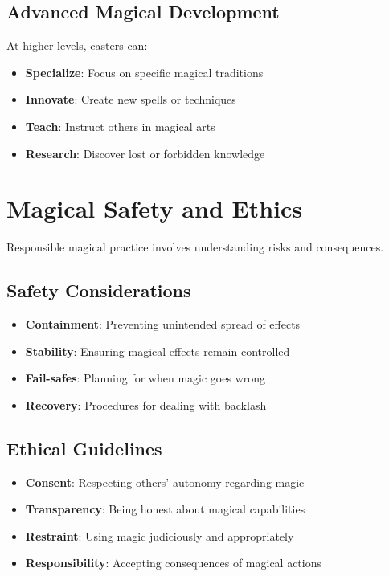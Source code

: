\subsection*{Advanced Magical Development}
At higher levels, casters can:
\begin{itemize}
\item \textbf{Specialize}: Focus on specific magical traditions
\item \textbf{Innovate}: Create new spells or techniques
\item \textbf{Teach}: Instruct others in magical arts
\item \textbf{Research}: Discover lost or forbidden knowledge
\end{itemize}

\section{Magical Safety and Ethics}  

Responsible magical practice involves understanding risks and consequences.

\subsection*{Safety Considerations}
\begin{itemize}
\item \textbf{Containment}: Preventing unintended spread of effects
\item \textbf{Stability}: Ensuring magical effects remain controlled
\item \textbf{Fail-safes}: Planning for when magic goes wrong
\item \textbf{Recovery}: Procedures for dealing with backlash
\end{itemize}

\subsection*{Ethical Guidelines}
\begin{itemize}
\item \textbf{Consent}: Respecting others' autonomy regarding magic
\item \textbf{Transparency}: Being honest about magical capabilities
\item \textbf{Restraint}: Using magic judiciously and appropriately
\item \textbf{Responsibility}: Accepting consequences of magical actions
\end{itemize}

